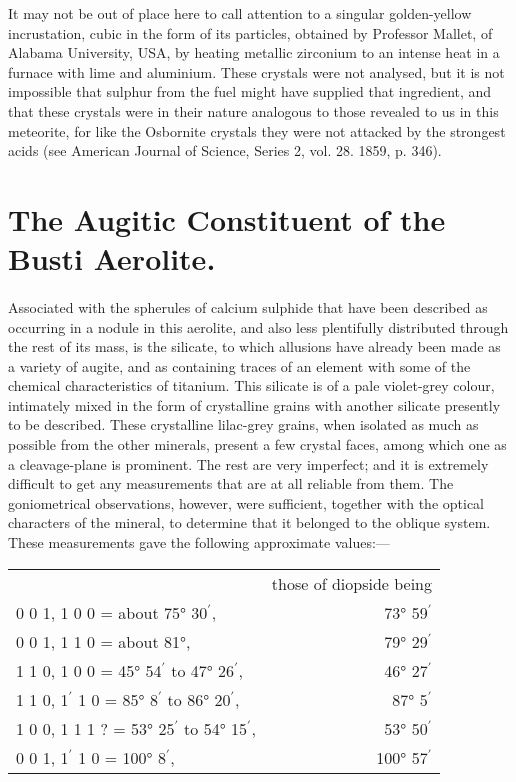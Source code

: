 \documentclass[a4paper, 12pt, oneside]{article}
\begin{document}
It may not be out of place here to call attention to a singular golden-yellow incrustation, cubic in the form of its particles, obtained by Professor Mallet, of Alabama University, USA, by heating metallic zirconium to an intense heat in a furnace with lime and aluminium. These crystals were not analysed, but it is not impossible that sulphur from the fuel might have supplied that ingredient, and that these crystals were in their nature analogous to those revealed to us in this meteorite, for like the Osbornite crystals they were not attacked by the strongest acids (see American Journal of Science, Series 2, vol. 28. 1859, p. 346).
\clearpage
\section{The Augitic Constituent of the Busti Aerolite.}
\paragraph{}
Associated with the spherules of calcium sulphide that have been described as occurring in a nodule in this aerolite, and also less plentifully distributed through the rest of its mass, is the silicate, to which allusions have already been made as a variety of augite, and as containing traces of an element with some of the chemical characteristics of titanium. This silicate is of a pale violet-grey colour, intimately mixed in the form of crystalline grains with another silicate presently to be described. These crystalline lilac-grey grains, when isolated as much as possible from the other minerals, present a few crystal faces, among which one as a cleavage-plane is prominent. The rest are very imperfect; and it is extremely difficult to get any measurements that are at all reliable from them. The goniometrical observations, however, were sufficient, together with the optical characters of the mineral, to determine that it belonged to the oblique system. These measurements gave the following approximate values:---
\begin{table}[H]
    \centering
    \footnotesize
    \begin{tabular}{l r}
        ~ & those of diopside being\\
        0 0 1, 1 0 0 = about 75° 30$^{\prime}$, & 73° 59$^{\prime}$\\
        0 0 1, 1 1 0 = about 81°, & 79° 29$^{\prime}$\\
        1 1 0, 1 0 0 = 45° 54$^{\prime}$ to 47° 26$^{\prime}$, & 46° 27$^{\prime}$\\
        1 1 0, 1$^{\prime}$ 1 0 = 85° 8$^{\prime}$ to 86° 20$^{\prime}$, & 87° 5$^{\prime}$\\
        1 0 0, 1 1 1 ? = 53° 25$^{\prime}$ to 54° 15$^{\prime}$, & 53° 50$^{\prime}$\\
        0 0 1, 1$^{\prime}$ 1 0 = 100° 8$^{\prime}$, & 100° 57$^{\prime}$\\
    \end{tabular}
\end{table}
\end{document}
